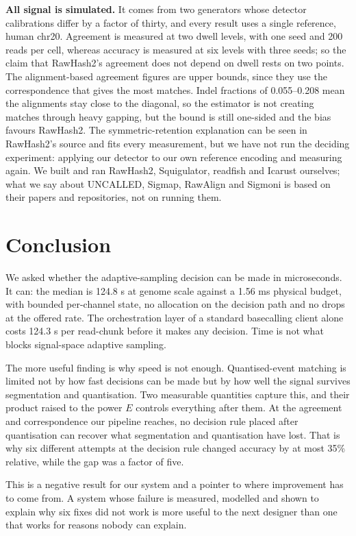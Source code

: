 \documentclass[conference]{IEEEtran}
\begin{document}
\textbf{All signal is simulated.} It comes from two generators whose detector calibrations differ
by a factor of thirty, and every result uses a single reference, human chr20. Agreement is
measured at two dwell levels, with one seed and 200 reads per cell, whereas accuracy is measured
at six levels with three seeds; so the claim that RawHash2's agreement does not depend on dwell
rests on two points. The alignment-based agreement figures are upper bounds, since they use the
correspondence that gives the most matches. Indel fractions of 0.055--0.208 mean the alignments
stay close to the diagonal, so the estimator is not creating matches through heavy gapping, but
the bound is still one-sided and the bias favours RawHash2. The symmetric-retention explanation
can be seen in RawHash2's source and fits every measurement, but we have not run the deciding
experiment: applying our detector to our own reference encoding and measuring again. We built and
ran RawHash2, Squigulator, readfish and Icarust ourselves; what we say about UNCALLED, Sigmap,
RawAlign and Sigmoni is based on their papers and repositories, not on running them.

\section{Conclusion}

We asked whether the adaptive-sampling decision can be made in microseconds. It can: the median
is 124.8 \textmu{}s at genome scale against a 1.56 ms physical budget, with bounded per-channel
state, no allocation on the decision path and no drops at the offered rate. The orchestration
layer of a standard basecalling client alone costs 124.3 \textmu{}s per read-chunk before it makes
any decision. Time is not what blocks signal-space adaptive sampling.

The more useful finding is why speed is not enough. Quantised-event matching is limited not by
how fast decisions can be made but by how well the signal survives segmentation and
quantisation. Two measurable quantities capture this, and their product raised to the power $E$
controls everything after them. At the agreement and correspondence our pipeline reaches, no
decision rule placed after quantisation can recover what segmentation and quantisation have lost.
That is why six different attempts at the decision rule changed accuracy by at most 35\%
relative, while the gap was a factor of five.

This is a negative result for our system and a pointer to where improvement has to come from. A
system whose failure is measured, modelled and shown to explain why six fixes did not work is
more useful to the next designer than one that works for reasons nobody can explain.
\end{document}
